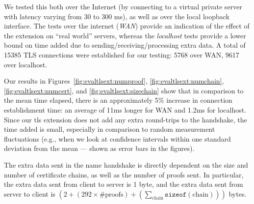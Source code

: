 We tested this both over the Internet (by connecting to a virtual private server
with latency varying from 30 to 300 ms), as well
as over the local loopback interface. The
tests over the internet (\emph{WAN}) provide an indication of the effect of
the extension on ``real world'' servers, 
whereas the \emph{localhost} tests provide a lower bound on time added due to
sending/receiving/processing extra data. A total of 15385 TLS connections were
established for our testing: 5768 over WAN, 9617 over localhost.

Our results in Figures~\ref{fig:evaltlsext:numproof},
\ref{fig:evaltlsext:numchain}, \ref{fig:evaltlsext:numcert}, and
\ref{fig:evaltlsext:sizechain} show that in comparison to the mean time
elapsed, there is an approximately 5\% increase in connection establishment
time: an average of 11ms longer for WAN and 1.2ms for localhost. 
Since our \ac{tls} extension does not add any extra round-trips to the
handshake, the time added is small, especially in comparison to random
measurement fluctuations (e.g., when we look at confidence intervals within one
standard deviation from the mean --- shown as error bars in the figures).

The extra data sent in the \ac{name} handshake is directly dependent on the size
and number of certificate chains, as well as the number of proofs sent. In
particular, the extra data sent from client to server is 1 byte, and the extra
data sent from server to client is
$(2 + (292 \times \text{\#proofs}) +
(\sum_{\text{chain}}\texttt{sizeof}(\text{chain})))$ bytes. 
